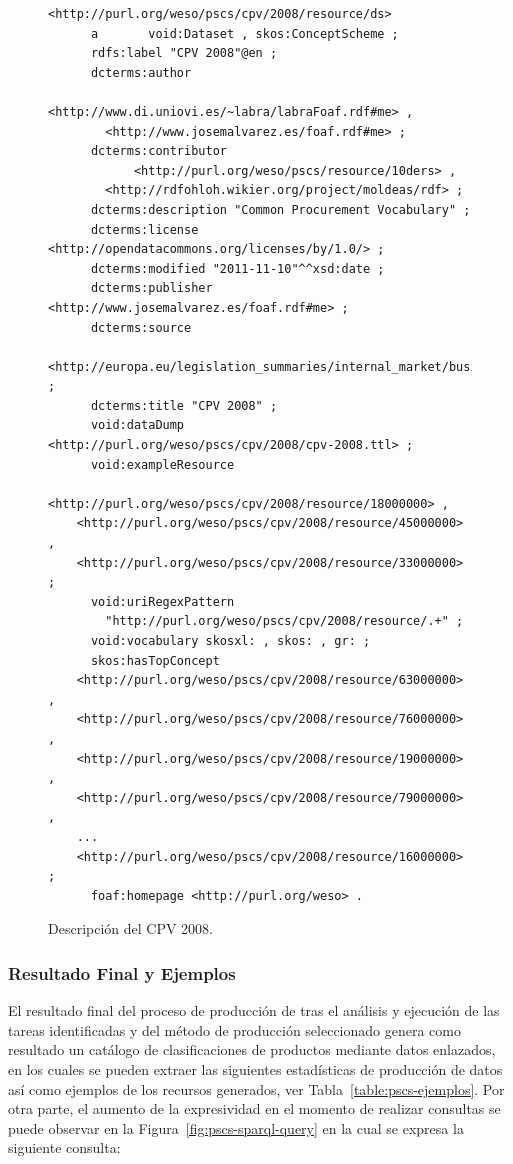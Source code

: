 \begin{figure}[!htp]
\begin{lstlisting} 
<http://purl.org/weso/pscs/cpv/2008/resource/ds>
      a       void:Dataset , skos:ConceptScheme ;
      rdfs:label "CPV 2008"@en ;
      dcterms:author 
            <http://www.di.uniovi.es/~labra/labraFoaf.rdf#me> , 
	    <http://www.josemalvarez.es/foaf.rdf#me> ;
      dcterms:contributor
            <http://purl.org/weso/pscs/resource/10ders> ,
	    <http://rdfohloh.wikier.org/project/moldeas/rdf> ;
      dcterms:description "Common Procurement Vocabulary" ;
      dcterms:license <http://opendatacommons.org/licenses/by/1.0/> ;
      dcterms:modified "2011-11-10"^^xsd:date ;
      dcterms:publisher <http://www.josemalvarez.es/foaf.rdf#me> ;
      dcterms:source 
	<http://europa.eu/legislation_summaries/internal_market/businesses/public_procurement/l22008_en.htm> ;
      dcterms:title "CPV 2008" ;
      void:dataDump <http://purl.org/weso/pscs/cpv/2008/cpv-2008.ttl> ;
      void:exampleResource
        <http://purl.org/weso/pscs/cpv/2008/resource/18000000> , 
	<http://purl.org/weso/pscs/cpv/2008/resource/45000000> , 
	<http://purl.org/weso/pscs/cpv/2008/resource/33000000> ;
      void:uriRegexPattern
        "http://purl.org/weso/pscs/cpv/2008/resource/.+" ;
      void:vocabulary skosxl: , skos: , gr: ;
      skos:hasTopConcept 
	<http://purl.org/weso/pscs/cpv/2008/resource/63000000> ,
	<http://purl.org/weso/pscs/cpv/2008/resource/76000000> , 
	<http://purl.org/weso/pscs/cpv/2008/resource/19000000> , 
	<http://purl.org/weso/pscs/cpv/2008/resource/79000000> , 	
	...
	<http://purl.org/weso/pscs/cpv/2008/resource/16000000> ;
      foaf:homepage <http://purl.org/weso> .
\end{lstlisting}
	\caption{Descripción del \dataset CPV 2008.}
	\label{fig:pscs-ds-cpv-2008}
\end{figure}

\cleardoublepage

\subsubsection{Resultado Final y Ejemplos}\label{resultado-pscs}
El resultado final del proceso de producción de \linkeddata tras el análisis y ejecución 
de las tareas identificadas y del método de producción seleccionado genera como resultado un catálogo 
de clasificaciones de productos mediante datos enlazados, en los cuales se pueden extraer las siguientes 
estadísticas de producción de datos así como ejemplos de los recursos generados, ver Tabla~\ref{table:pscs-ejemplos}. Por otra parte, 
el aumento de la expresividad en el momento de realizar consultas se puede observar en la Figura~\ref{fig:pscs-sparql-query} en la 
cual se expresa la siguiente consulta:

